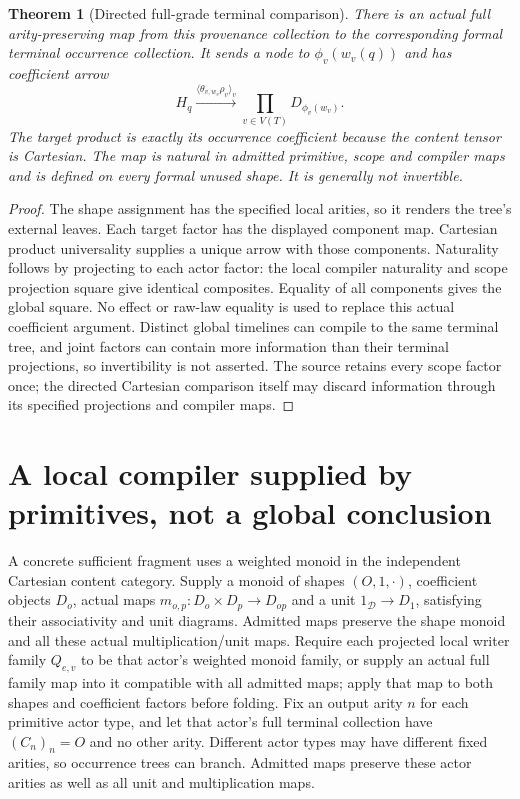\documentclass[11pt]{article}
\newtheorem{theorem}{Theorem}\newtheorem{proposition}[theorem]{Proposition}
\begin{document}
\begin{theorem}[Directed full-grade terminal comparison]
There is an actual full arity-preserving map from this provenance collection to the corresponding formal terminal occurrence collection. It sends a node to $\phi_v(w_v(q))$ and has coefficient arrow
\[
 H_q\xrightarrow{\langle\theta_{v,w_v}\rho_v\rangle_v}
 \prod_{v\in V(T)}D_{\phi_v(w_v)}.
\]
The target product is exactly its occurrence coefficient because the content tensor is Cartesian. The map is natural in admitted primitive, scope and compiler maps and is defined on every formal unused shape. It is generally not invertible.
\end{theorem}
\begin{proof}
The shape assignment has the specified local arities, so it renders the tree's external leaves. Each target factor has the displayed component map. Cartesian product universality supplies a unique arrow with those components. Naturality follows by projecting to each actor factor: the local compiler naturality and scope projection square give identical composites. Equality of all components gives the global square. No effect or raw-law equality is used to replace this actual coefficient argument. Distinct global timelines can compile to the same terminal tree, and joint factors can contain more information than their terminal projections, so invertibility is not asserted. The source retains every scope factor once; the directed Cartesian comparison itself may discard information through its specified projections and compiler maps.
\end{proof}

\section{A local compiler supplied by primitives, not a global conclusion}
A concrete sufficient fragment uses a weighted monoid in the independent Cartesian content category. Supply a monoid of shapes $(O,1,\cdot)$, coefficient objects $D_o$, actual maps $m_{o,p}:D_o\times D_p\to D_{op}$ and a unit $1_{\mathcal D}\to D_1$, satisfying their associativity and unit diagrams. Admitted maps preserve the shape monoid and all these actual multiplication/unit maps. Require each projected local writer family $Q_{e,v}$ to be that actor's weighted monoid family, or supply an actual full family map into it compatible with all admitted maps; apply that map to both shapes and coefficient factors before folding. Fix an output arity $n$ for each primitive actor type, and let that actor's full terminal collection have $(C_n)_n=O$ and no other arity. Different actor types may have different fixed arities, so occurrence trees can branch. Admitted maps preserve these actor arities as well as all unit and multiplication maps.
\end{document}
